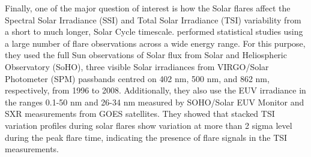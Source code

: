 {%
\begin{table}[]
    \centering
    \caption{Spectral Energy Distribution from a sample of 2100 flares across various wavelengths\citep{kretzschmar11}.}
    \label{tab1}
\end{table}

Finally, one of the major question of interest is how the Solar flares affect the Spectral Solar Irradiance (SSI) and Total Solar Irradiance (TSI) variability from a short to much longer, Solar Cycle timescale. \cite{kretzschmar10,kretzschmar11} performed statistical studies using a large number of flare observations across a wide energy range. For this purpose, they used the full Sun observations of Solar flux from Solar and Heliospheric Observatory (SoHO), three visible Solar irradiances from VIRGO/Solar Photometer (SPM) passbands centred on 402 nm, 500 nm, and 862 nm, respectively, from 1996 to 2008. Additionally, they also use the EUV irradiance in the ranges 0.1-50 nm and 26-34 nm measured by SOHO/Solar EUV Monitor \citep{judge98} and SXR measurements from GOES satellites. They showed that stacked TSI variation profiles during solar flares show variation at more than 2 sigma level during the peak flare time, indicating the presence of flare signals in the TSI measurements.

}
